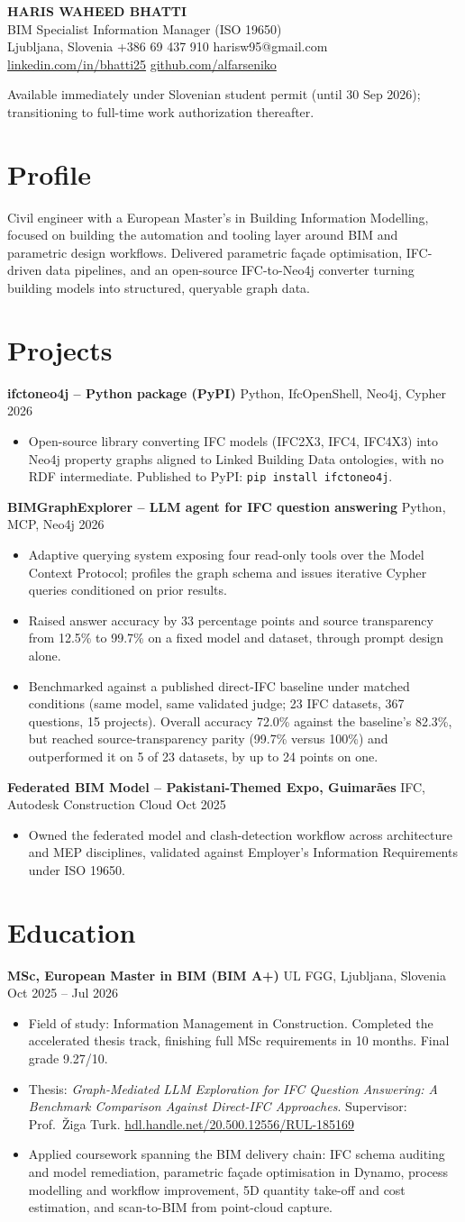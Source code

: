 \documentclass[a4paper,10.5pt]{article}
\newcommand{\datefill}{\dotfill}
\newcommand{\entry}[3]{\vspace{2.5pt}\noindent\textbf{#1} \textbar{} #2 \datefill{} #3\par\vspace{0.5pt}}
\newcommand{\ROLELINE}{BIM Specialist \textbar{} Information Manager (ISO 19650)}
\newcommand{\projIfcToNeo}{%
\entry{ifctoneo4j -- Python package (PyPI)}{Python, IfcOpenShell, Neo4j, Cypher}{2026}
\begin{itemize}
  \item Open-source library converting IFC models (IFC2X3, IFC4, IFC4X3) into Neo4j
        property graphs aligned to Linked Building Data ontologies, with no RDF
        intermediate. Published to PyPI: \texttt{pip install ifctoneo4j}.
\end{itemize}}
\newcommand{\projBIMGraph}{%
\entry{BIMGraphExplorer -- LLM agent for IFC question answering}{Python, MCP, Neo4j}{2026}
\begin{itemize}
  \item Adaptive querying system exposing four read-only tools over the Model
        Context Protocol; profiles the graph schema and issues iterative Cypher
        queries conditioned on prior results.
  \item Raised answer accuracy by 33 percentage points and source transparency from
        12.5\% to 99.7\% on a fixed model and dataset, through prompt design alone.
  \item Benchmarked against a published direct-IFC baseline under matched
        conditions (same model, same validated judge; 23 IFC datasets, 367
        questions, 15 projects). Overall accuracy 72.0\% against the baseline's
        82.3\%, but reached source-transparency parity (99.7\% versus 100\%) and
        outperformed it on 5 of 23 datasets, by up to 24 points on one.
\end{itemize}}
\newcommand{\projGuimaraes}{%
\entry{Federated BIM Model -- Pakistani-Themed Expo, Guimar\~aes}{IFC, Autodesk Construction Cloud}{Oct 2025}
\begin{itemize}
  \item Owned the federated model and clash-detection workflow across architecture
        and MEP disciplines, validated against Employer's Information Requirements
        under ISO 19650.
\end{itemize}}
\begin{document}
\begin{center}
  {\LARGE\bfseries HARIS WAHEED BHATTI}\\[2pt]
  {\large \ROLELINE}\\[3pt]
  Ljubljana, Slovenia \textbar{} +386 69 437 910 \textbar{} harisw95@gmail.com\\
  \href{https://linkedin.com/in/bhatti25}{linkedin.com/in/bhatti25} \textbar{}
  \href{https://github.com/alfarseniko}{github.com/alfarseniko}
\end{center}
\vspace{-4pt}
\noindent\small Available immediately under Slovenian student permit (until 30 Sep 2026); transitioning to full-time work authorization thereafter.\normalsize

\section{Profile}

\noindent Civil engineer with a European Master's in Building Information Modelling,
focused on building the automation and tooling layer around BIM and parametric design
workflows. Delivered parametric fa\c{c}ade optimisation, IFC-driven data pipelines, and
an open-source IFC-to-Neo4j converter turning building models into structured,
queryable graph data.

\section{Projects}

 \projIfcToNeo \projBIMGraph \projGuimaraes

\section{Education}
\entry{MSc, European Master in BIM (BIM A+)}{UL FGG, Ljubljana, Slovenia}{Oct 2025 -- Jul 2026}
\begin{itemize}
  \item Field of study: Information Management in Construction. Completed the
        accelerated thesis track, finishing full MSc requirements in 10 months.
        Final grade 9.27/10.
  \item Thesis: \textit{Graph-Mediated LLM Exploration for IFC Question Answering:
        A Benchmark Comparison Against Direct-IFC Approaches}. Supervisor:
        Prof.~\v{Z}iga Turk. \href{http://hdl.handle.net/20.500.12556/RUL-185169}{hdl.handle.net/20.500.12556/RUL-185169}
  \item Applied coursework spanning the BIM delivery chain: IFC schema auditing and model remediation, parametric façade optimisation in Dynamo, process modelling and workflow improvement, 5D quantity take-off and cost estimation, and scan-to-BIM from point-cloud capture.
\end{itemize}
\end{document}
